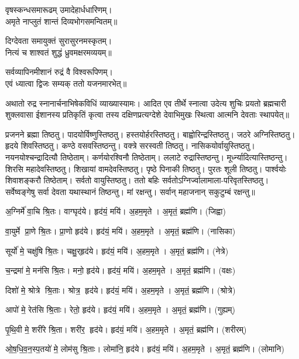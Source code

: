 वृषस्कन्धसमारूढम् उमादेहार्धधारिणम्।\\
अमृते  नाप्लुतं शान्तं दिव्यभोगसमन्वितम्॥

दिग्देवता समायुक्तं सुरासुरनमस्कृतम्।\\
नित्यं च शाश्वतं शुद्धं ध्रुवमक्षरमव्ययम्॥

सर्वव्यापिनमीशानं रुद्रं वै विश्वरूपिणम्।\\
एवं ध्यात्वा द्विजः सम्यक् ततो यजनमारभेत्॥

अथातो रुद्र स्नानार्चनाभिषेकविधिं व्याख्यास्यामः। आदित एव तीर्थे स्नात्वा उदेत्य शुचिः
प्रयतो ब्रह्मचारी शुक्लवासा ईशानस्य प्रतिकृतिं कृत्वा तस्य दक्षिणप्रत्यग्देशे देवाभिमुखः स्थित्वा आत्मनि देवताः स्थापयेत्॥

प्रजनने ब्रह्मा तिष्ठतु। पादयोर्विष्णुस्तिष्ठतु। 
हस्तयोर्हरस्तिष्ठतु। बाह्वोरिन्द्रस्तिष्ठतु। 
जठरे अग्निस्तिष्ठतु। हृदये शिवस्तिष्ठतु। 
कण्ठे वसवस्तिष्ठन्तु। वक्त्रे सरस्वती तिष्ठतु। 
नासिकयोर्वायुस्तिष्ठतु। नयनयोश्चन्द्रादित्यौ तिष्ठेताम्। 
कर्णयोरश्विनौ तिष्ठेताम्। ललाटे रुद्रास्तिष्ठन्तु। 
मूर्ध्न्यादित्यास्तिष्ठन्तु। शिरसि महादेवस्तिष्ठतु। 
शिखायां वामदेवस्तिष्ठतु। पृष्ठे पिनाकी तिष्ठतु। 
पुरतः शूली तिष्ठतु। पार्श्वयोः शिवाशङ्करौ तिष्ठेताम्। 
सर्वतो वायुस्तिष्ठतु। ततो बहिः सर्वतोऽग्निर्ज्वालामाला-परिवृतस्तिष्ठतु।
सर्वेष्वङ्गेषु सर्वा देवता यथास्थानं तिष्ठन्तु। मां रक्षन्तु।
\lbrack सर्वान् महाजनान् सकुटुम्बं रक्षन्तु॥\rbrack

अ॒ग्निर्मे॑ वा॒चि श्रि॒तः।   वाग्घृद॑ये।   हृद॑यं॒ मयि॑।   अ॒हम॒मृते।   अ॒मृतं॒ ब्रह्म॑णि। (जिह्वा)

 वा॒युर्मे प्रा॒णे श्रि॒तः।   प्रा॒णो हृद॑ये।   हृद॑यं॒ मयि॑।   अ॒हम॒मृते।   अ॒मृतं॒ ब्रह्म॑णि। (नासिका)

   सूर्यो॑ मे॒ चक्षु॑षि श्रि॒तः।   चक्षु॒र्‌हृद॑ये।   हृद॑यं॒ मयि॑।   अ॒हम॒मृते।   अ॒मृतं॒ ब्रह्म॑णि। (नेत्रे)

   च॒न्द्रमा॑ मे॒ मन॑सि श्रि॒तः।   मनो॒ हृद॑ये।   हृद॑यं॒ मयि॑।   अ॒हम॒मृते।   अ॒मृतं॒ ब्रह्म॑णि। (वक्षः)

   दिशो॑ मे॒ श्रोत्रे श्रि॒ताः।   श्रोत्र॒ हृद॑ये।   हृद॑यं॒ मयि॑।   अ॒हम॒मृते।   अ॒मृतं॒ ब्रह्म॑णि। (श्रोत्रे)

   आपो॑ मे॒ रेत॑सि श्रि॒ताः।   रेतो॒ हृद॑ये।   हृद॑यं॒ मयि॑।   अ॒हम॒मृते।   अ॒मृतं॒ ब्रह्म॑णि। (गुह्यम्)

   पृ॒थि॒वी मे॒ शरी॑रे श्रि॒ता।   शरी॑र॒ हृद॑ये।   हृद॑यं॒ मयि॑।   अ॒हम॒मृते।   अ॒मृतं॒ ब्रह्म॑णि। (शरीरम्)

   ओ॒ष॒धि॒व॒न॒स्प॒तयो॑ मे॒ लोम॑सु श्रि॒ताः।   लोमा॑नि॒ हृद॑ये।   हृद॑यं॒ मयि॑।   अ॒हम॒मृते।   अ॒मृतं॒ ब्रह्म॑णि। (लोमानि)

